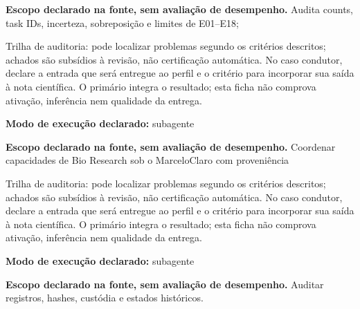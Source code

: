\begin{descricao}
\textbf{Escopo declarado na fonte, sem avaliação de desempenho.}
Audita counts, task IDs, incerteza, sobreposição e limites de E01–E18;
\end{descricao}

\begin{funcao}
Trilha de auditoria: pode localizar problemas segundo os critérios descritos; achados são subsídios à revisão, não certificação automática. No caso condutor, declare a entrada que será entregue ao perfil e o critério para incorporar sua saída à nota científica. O primário integra o resultado; esta ficha não comprova ativação, inferência nem qualidade da entrega.
\end{funcao}

\begin{arquitetura}
\textbf{Modo de execução declarado:} subagente
\end{arquitetura}


\begin{descricao}
\textbf{Escopo declarado na fonte, sem avaliação de desempenho.}
Coordenar capacidades de Bio Research sob o MarceloClaro com proveniência
\end{descricao}

\begin{funcao}
Trilha de auditoria: pode localizar problemas segundo os critérios descritos; achados são subsídios à revisão, não certificação automática. No caso condutor, declare a entrada que será entregue ao perfil e o critério para incorporar sua saída à nota científica. O primário integra o resultado; esta ficha não comprova ativação, inferência nem qualidade da entrega.
\end{funcao}

\begin{arquitetura}
\textbf{Modo de execução declarado:} subagente
\end{arquitetura}


\begin{descricao}
\textbf{Escopo declarado na fonte, sem avaliação de desempenho.}
Auditar registros, hashes, custódia e estados históricos.
\end{descricao}

